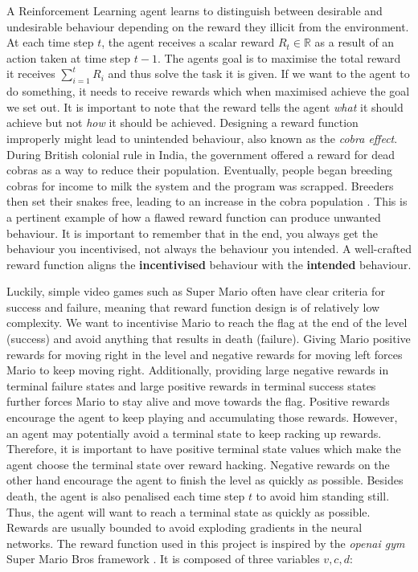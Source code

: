 \documentclass[notitlepage,a4paper,11pt]{article}
\newcommand{\R}{\mathbb{R}}
\begin{document}
A Reinforcement Learning agent learns to distinguish between desirable and undesirable behaviour depending on the reward they illicit from the environment. At each time step $t$, the agent receives a scalar reward $R_t \in \R$ as a result of an action taken at time step $t-1$. The agents goal is to maximise the total reward it receives $\sum^{t}_{i=1} R_i$ and thus solve the task it is given. If we want to the agent to do something, it needs to receive rewards which when maximised achieve the goal we set out. It is important to note that the reward tells the agent \textit{what} it should achieve but not \textit{how} it should be achieved. Designing a reward function improperly might lead to unintended behaviour, also known as the \textit{cobra effect}. During British colonial rule in India, the government offered a reward for dead cobras as a way to reduce their population. Eventually, people began breeding cobras for income to milk the system and the program was scrapped. Breeders then set their snakes free, leading to an increase in the cobra population \cite{siebert2001kobra}. This is a pertinent example of how a flawed reward function can produce unwanted behaviour. It is important to remember that in the end, you always get the behaviour you incentivised, not always the behaviour you intended. A well-crafted reward function aligns the \textbf{incentivised} behaviour with the \textbf{intended} behaviour.

Luckily, simple video games such as Super Mario often have clear criteria for success and failure, meaning that reward function design is of relatively low complexity. We want to incentivise Mario to reach the flag at the end of the level (success) and avoid anything that results in death (failure). Giving Mario positive rewards for moving right in the level and negative rewards for moving left forces Mario to keep moving right. Additionally, providing large negative rewards in terminal failure states and large positive rewards in terminal success states further forces Mario to stay alive and move towards the flag. Positive rewards encourage the agent to keep playing and accumulating those rewards. However, an agent may potentially avoid a terminal state to keep racking up rewards. Therefore, it is important to have positive terminal state values which make the agent choose the terminal state over reward hacking. Negative rewards on the other hand encourage the agent to finish the level as quickly as possible. Besides death, the agent is also penalised each time step $t$ to avoid him standing still. Thus, the agent will want to reach a terminal state as quickly as possible. Rewards are usually bounded to avoid exploding gradients in the neural networks.
\linebreak
The reward function used in this project is inspired by the  \textit{openai gym} Super Mario Bros framework \cite{pypi}. It is composed of three variables $v, c, d$:
\end{document}
